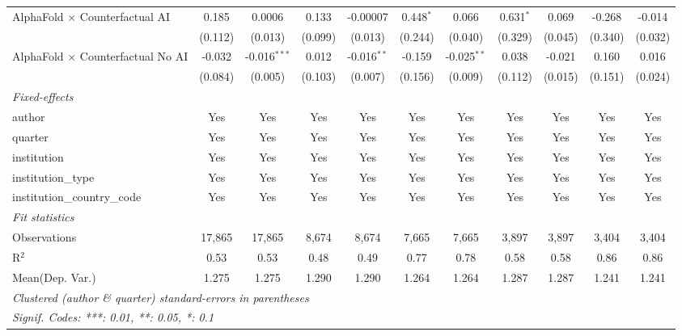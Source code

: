 \begin{tabular}{lcccccccccc}
   AlphaFold $\times$ Counterfactual AI     & 0.185   & 0.0006         & 0.133   & -0.00007      & 0.448$^{*}$ & 0.066         & 0.631$^{*}$ & 0.069        & -0.268  & -0.014\\   
                                            & (0.112) & (0.013)        & (0.099) & (0.013)       & (0.244)     & (0.040)       & (0.329)     & (0.045)      & (0.340) & (0.032)\\   
   AlphaFold $\times$ Counterfactual No AI  & -0.032  & -0.016$^{***}$ & 0.012   & -0.016$^{**}$ & -0.159      & -0.025$^{**}$ & 0.038       & -0.021       & 0.160   & 0.016\\   
                                            & (0.084) & (0.005)        & (0.103) & (0.007)       & (0.156)     & (0.009)       & (0.112)     & (0.015)      & (0.151) & (0.024)\\   
   \midrule
   \emph{Fixed-effects}\\
   author                                   & Yes     & Yes            & Yes     & Yes           & Yes         & Yes           & Yes         & Yes          & Yes     & Yes\\  
   quarter                                  & Yes     & Yes            & Yes     & Yes           & Yes         & Yes           & Yes         & Yes          & Yes     & Yes\\  
   institution                              & Yes     & Yes            & Yes     & Yes           & Yes         & Yes           & Yes         & Yes          & Yes     & Yes\\  
   institution\_type                        & Yes     & Yes            & Yes     & Yes           & Yes         & Yes           & Yes         & Yes          & Yes     & Yes\\  
   institution\_country\_code               & Yes     & Yes            & Yes     & Yes           & Yes         & Yes           & Yes         & Yes          & Yes     & Yes\\  
   \midrule
   \emph{Fit statistics}\\
   Observations                             & 17,865  & 17,865         & 8,674   & 8,674         & 7,665       & 7,665         & 3,897       & 3,897        & 3,404   & 3,404\\  
   R$^2$                                    & 0.53    & 0.53           & 0.48    & 0.49          & 0.77        & 0.78          & 0.58        & 0.58         & 0.86    & 0.86\\  
Mean(Dep. Var.) & 1.275 & 1.275 & 1.290 & 1.290 & 1.264 & 1.264 & 1.287 & 1.287 & 1.241 & 1.241 \\
   \midrule \midrule
   \multicolumn{11}{l}{\emph{Clustered (author \& quarter) standard-errors in parentheses}}\\
   \multicolumn{11}{l}{\emph{Signif. Codes: ***: 0.01, **: 0.05, *: 0.1}}\\
\end{tabular}
\par\endgroup
